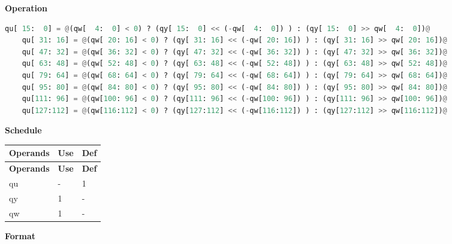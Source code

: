 \textbf{Operation}\\
\begin{lstlisting}[language=Python, escapechar=@]
    qu[ 15:  0] = @(qw[  4:  0] < 0) ? (qy[ 15:  0] << (-qw[  4:  0]) ) : (qy[ 15:  0] >> qw[  4:  0])@
    qu[ 31: 16] = @(qw[ 20: 16] < 0) ? (qy[ 31: 16] << (-qw[ 20: 16]) ) : (qy[ 31: 16] >> qw[ 20: 16])@
    qu[ 47: 32] = @(qw[ 36: 32] < 0) ? (qy[ 47: 32] << (-qw[ 36: 32]) ) : (qy[ 47: 32] >> qw[ 36: 32])@
    qu[ 63: 48] = @(qw[ 52: 48] < 0) ? (qy[ 63: 48] << (-qw[ 52: 48]) ) : (qy[ 63: 48] >> qw[ 52: 48])@
    qu[ 79: 64] = @(qw[ 68: 64] < 0) ? (qy[ 79: 64] << (-qw[ 68: 64]) ) : (qy[ 79: 64] >> qw[ 68: 64])@
    qu[ 95: 80] = @(qw[ 84: 80] < 0) ? (qy[ 95: 80] << (-qw[ 84: 80]) ) : (qy[ 95: 80] >> qw[ 84: 80])@
    qu[111: 96] = @(qw[100: 96] < 0) ? (qy[111: 96] << (-qw[100: 96]) ) : (qy[111: 96] >> qw[100: 96])@
    qu[127:112] = @(qw[116:112] < 0) ? (qy[127:112] << (-qw[116:112]) ) : (qy[127:112] >> qw[116:112])@

\end{lstlisting}

\textbf{Schedule}\\
\begin{longtable}[c]{|l|l|l|}
    \hline
    \rowcolor{lightgray}
    \textbf{Operands} & \textbf{Use} & \textbf{Def} \\\hline
    \endfirsthead
    \hline
    \rowcolor{lightgray}
     \textbf{Operands} & \textbf{Use} & \textbf{Def} \\\hline
    \endhead
    \hline
    \endfoot

  qu & - & 1 \\\hline
  qy & 1 & - \\\hline
  qw & 1 & -

\end{longtable}


\textbf{Format}\\

